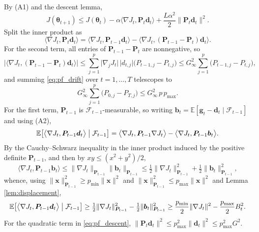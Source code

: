 \documentclass[pdflatex,sn-mathphys-num]{sn-jnl}%
\theoremstyle{thmstyleone}%
\theoremstyle{thmstyletwo}%
\theoremstyle{thmstylethree}%
\newcommand{\E}{\mathbb{E}}
\begin{document}
\begin{appendices}
By (A1) and the descent lemma,
\begin{equation}
\label{eq:pf_descent}
J(\bm\theta_{t+1})\le J(\bm\theta_t)-\alpha\bigl\langle\nabla J_t,\bm P_t\bm d_t\bigr\rangle+\frac{L\alpha^2}{2}\bigl\|\bm P_t\bm d_t\bigr\|^2 .
\end{equation}
Split the inner product as
\begin{equation}
\bigl\langle\nabla J_t,\bm P_t\bm d_t\bigr\rangle
=
\bigl\langle\nabla J_t,\bm P_{t-1}\bm d_t\bigr\rangle
-\bigl\langle\nabla J_t,(\bm P_{t-1}-\bm P_t)\bm d_t\bigr\rangle .
\end{equation}
For the second term, all entries of $\bm P_{t-1}-\bm P_t$ are nonnegative, so
\begin{equation}
\label{eq:pf_drift}
\bigl|\bigl\langle\nabla J_t,(\bm P_{t-1}-\bm P_t)\bm d_t\bigr\rangle\bigr|
\le
\sum_{j=1}^{p}\bigl|\nabla_jJ_t\bigr|\,\bigl|d_{t,j}\bigr|\bigl(P_{t-1,j}-P_{t,j}\bigr)
\le
G_\infty^{2}\sum_{j=1}^{p}\bigl(P_{t-1,j}-P_{t,j}\bigr),
\end{equation}
and summing \eqref{eq:pf_drift} over $t=1,\dots,T$ telescopes to
\begin{equation}
\label{eq:pf_telescope}
G_\infty^{2}\sum_{j=1}^{p}\bigl(P_{0,j}-P_{T,j}\bigr)\le G_\infty^{2}\,p\,p_{\max}.
\end{equation}
For the first term, $\bm P_{t-1}$ is $\mathcal F_{t-1}$-measurable, so writing $\bm b_t=\E[\bm g_t-\bm d_t\mid\mathcal F_{t-1}]$ and using (A2),
\begin{equation}
\E\bigl[\bigl\langle\nabla J_t,\bm P_{t-1}\bm d_t\bigr\rangle\bigm|\mathcal F_{t-1}\bigr]
=
\bigl\langle\nabla J_t,\bm P_{t-1}\nabla J_t\bigr\rangle-\bigl\langle\nabla J_t,\bm P_{t-1}\bm b_t\bigr\rangle .
\end{equation}
By the Cauchy--Schwarz inequality in the inner product induced by the positive definite $\bm P_{t-1}$, and then by $xy\le(x^2+y^2)/2$,
\begin{equation}
\bigl\langle\nabla J_t,\bm P_{t-1}\bm b_t\bigr\rangle
\le
\|\nabla J_t\|_{\bm P_{t-1}}\|\bm b_t\|_{\bm P_{t-1}}
\le
\tfrac12\|\nabla J_t\|^2_{\bm P_{t-1}}+\tfrac12\|\bm b_t\|^2_{\bm P_{t-1}} ,
\end{equation}
whence, using $\|\bm x\|^2_{\bm P_{t-1}}\ge p_{\min}\|\bm x\|^2$ and $\|\bm x\|^2_{\bm P_{t-1}}\le p_{\max}\|\bm x\|^2$ and Lemma \ref{lem:displacement},
\begin{equation}
\label{eq:pf_lower}
\E\bigl[\bigl\langle\nabla J_t,\bm P_{t-1}\bm d_t\bigr\rangle\bigm|\mathcal F_{t-1}\bigr]
\ge
\tfrac12\|\nabla J_t\|^2_{\bm P_{t-1}}-\tfrac12\|\bm b_t\|^2_{\bm P_{t-1}}
\ge
\frac{p_{\min}}2\|\nabla J_t\|^{2}-\frac{p_{\max}}2B^2_t .
\end{equation}
For the quadratic term in \eqref{eq:pf_descent}, $\|\bm P_t\bm d_t\|^2\le p^2_{\max}\|\bm d_t\|^2\le p^2_{\max}G^2$.


\end{appendices}
\end{document}
